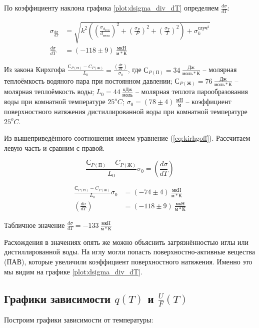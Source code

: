 \documentclass[a4paper, 12pt]{article}
\begin{document}
			По коэффициенту наклона графика \ref{plot:dsigma_div_dT} определяем $\frac{d\sigma}{dT}$:

			\begin{align*}
				\sigma_{\frac{d\sigma}{dT}} &= \sqrt{k^2 \left( \left( \frac{\sigma_{d_{игла}}}{d_{игла}} \right)^2 + \left( \frac{\sigma_P}{P} \right)^2 + \left( \frac{\sigma_T}{T} \right)^2 \right) + \sigma_k^{случ^2}}\\
				\frac{d\sigma}{dT} &= (-118 \pm 9)~\frac{мкН}{м*К}
			\end{align*}

			Из закона Кирхгофа $\frac{С_{P(П)} - C_{P(Ж)}}{L_0} = \frac{\left( \frac{d\sigma}{dT} \right)}{\sigma_0} $, где $С_{P(П)} = 34~\frac{Дж}{моль*К}$ -- молярная теплоёмкость водяного пара при постоянном давлении; $С_{P(Ж)} = 76~\frac{Дж}{моль*К}$ -- молярная теплоёмкость воды; $L_0 = 44~\frac{кДж}{моль}$ -- молярная теплота парообразования воды при комнатной температуре $25^oC$; $\sigma_0 = (78 \pm 4)~\frac{мН}{м}$ -- коэффициент поверхностного натяжения дистиллированной воды при комнатной температуре $25^oC$.

			Из вышеприведённого соотношения имеем уравнение (\ref{eq:kirhgoff}). Рассчитаем левую часть и сравним с правой.

			\begin{equation}
				\frac{С_{P(П)} - C_{P(Ж)}}{L_0} \sigma_0 = \left( \frac{d\sigma}{dT} \right)
				\label{eq:kirhgoff}
			\end{equation}

			\begin{align*}
				\frac{С_{P(П)} - C_{P(Ж)}}{L_0} \sigma_0 &= (-74 \pm 4)~\frac{мкН}{м*К}\\
				\left( \frac{d\sigma}{dT} \right) &= (-118 \pm 9)~\frac{мкН}{м*К}
			\end{align*}

			Табличное значение $\frac{d\sigma}{dT} = -133~\frac{мкН}{м*К}$

			Расхождения в значениях опять же можно объяснить загрязнённостью иглы или дистиллированной воды. На иглу могли попасть поверхностно-активные вещества (ПАВ), которые увеличили коэффициент поверхностного натяжения. Именно это мы видим на графике \ref{plot:dsigma_div_dT}.

		\subsection{Графики зависимости $q(T)$ и $\frac{U}{F}(T)$}

			Построим графики зависимости от температуры:
\end{document}
